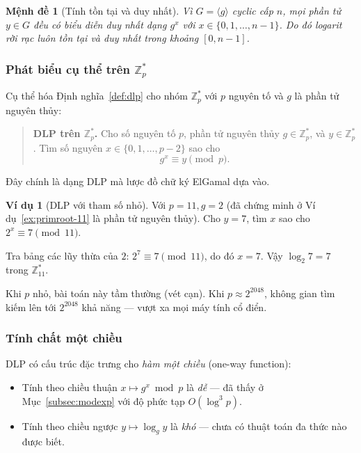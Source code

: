 \documentclass[12pt,a4paper]{report}
\newtheorem{proposition}[theorem]{Mệnh đề}
\theoremstyle{definition}
\newtheorem{example}[theorem]{Ví dụ}
\theoremstyle{remark}
\begin{document}
\begin{proposition}[Tính tồn tại và duy nhất]
Vì $G = \langle g \rangle$ cyclic cấp $n$, mọi phần tử $y \in G$ đều có biểu diễn duy nhất dạng $g^x$ với $x \in \{0, 1, \ldots, n-1\}$. Do đó logarit rời rạc luôn tồn tại và duy nhất trong khoảng $[0, n-1]$.
\end{proposition}

\subsubsection{Phát biểu cụ thể trên \texorpdfstring{$\mathbb{Z}_p^*$}{Zp*}}

Cụ thể hóa Định nghĩa~\ref{def:dlp} cho nhóm $\mathbb{Z}_p^*$ với $p$ nguyên tố và $g$ là phần tử nguyên thủy:

\begin{quote}
\textbf{DLP trên $\mathbb{Z}_p^*$.} Cho số nguyên tố $p$, phần tử nguyên thủy $g \in \mathbb{Z}_p^*$, và $y \in \mathbb{Z}_p^*$. Tìm số nguyên $x \in \{0, 1, \ldots, p-2\}$ sao cho
\[
g^x \equiv y \pmod{p}.
\]
\end{quote}

Đây chính là dạng DLP mà lược đồ chữ ký ElGamal dựa vào.

\begin{example}[DLP với tham số nhỏ]
Với $p = 11, g = 2$ (đã chứng minh ở Ví dụ~\ref{ex:primroot-11} là phần tử nguyên thủy). Cho $y = 7$, tìm $x$ sao cho $2^x \equiv 7 \pmod{11}$.

Tra bảng các lũy thừa của $2$: $2^7 \equiv 7 \pmod{11}$, do đó $x = 7$. Vậy $\log_2 7 = 7$ trong $\mathbb{Z}_{11}^*$.

\smallskip
Khi $p$ nhỏ, bài toán này tầm thường (vét cạn). Khi $p \approx 2^{2048}$, không gian tìm kiếm lên tới $2^{2048}$ khả năng --- vượt xa mọi máy tính cổ điển.
\end{example}

\subsubsection{Tính chất một chiều}

DLP có cấu trúc đặc trưng cho \emph{hàm một chiều} (one-way function):
\begin{itemize}[leftmargin=*]
    \item Tính theo chiều thuận $x \mapsto g^x \bmod p$ là \emph{dễ} --- đã thấy ở Mục~\ref{subsec:modexp} với độ phức tạp $O(\log^3 p)$.
    \item Tính theo chiều ngược $y \mapsto \log_g y$ là \emph{khó} --- chưa có thuật toán đa thức nào được biết.
\end{itemize}
\end{document}
